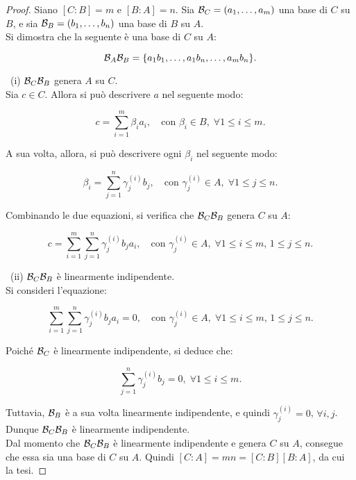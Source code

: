 \documentclass[11pt]{scrbook}
\begin{document}
\begin{proof}
    Siano $[C : B] = m$ e $[B : A] = n$. Sia
    $\mathcal{B}_C = (a_1, \ldots, a_m)$ una base
    di $C$ su $B$, e sia $\mathcal{B}_B = (b_1, \ldots, b_n)$ una
    base di $B$ su $A$. \\

    Si dimostra che la seguente è una base di $C$ su $A$:

    \[\mathcal{B}_A \mathcal{B}_B = \{ a_1b_1, \ldots, a_1b_n, \ldots, a_mb_n\}. \]

    \vskip 0.1in

    \ (i) $\mathcal{B}_C \mathcal{B}_B$ genera $A$ su $C$. \\

    Sia $c \in C$. Allora si può descrivere $a$ nel seguente
    modo:

    \[c = \sum_{i=1}^m \beta_i a_i, \quad \text{con } \beta_i \in B, \; \forall 1 \leq i \leq m.\]

    A sua volta, allora, si può descrivere ogni $\beta_i$ nel
    seguente modo:

    \[\beta_i = \sum_{j=1}^n \gamma_j^{(i)} b_j, \quad \text{con }
        \gamma_j^{(i)} \in A, \; \forall 1 \leq j \leq n.\]

    \vskip 0.1in

    Combinando le due equazioni, si verifica che $\mathcal{B}_C \mathcal{B}_B$ genera $C$ su $A$:

    \[ c = \sum_{i=1}^m \sum_{j=1}^n \gamma_j^{(i)} b_j a_i, \quad \text{con } \gamma_j^{(i)} \in A, \; \forall 1 \leq i \leq m, \, 1 \leq j \leq n. \]

    \vskip 0.1in

    \ (ii) $\mathcal{B}_C \mathcal{B}_B$ è linearmente indipendente. \\

    Si consideri l'equazione:

    \[ \sum_{i=1}^m \sum_{j=1}^n \gamma_j^{(i)} b_j a_i = 0, \quad \text{con } \gamma_j^{(i)} \in A, \; \forall 1 \leq i \leq m, \, 1 \leq j \leq n .\]

    Poiché $\mathcal{B}_C$ è linearmente indipendente, si deduce
    che:

    \[ \sum_{j=1}^n \gamma_j^{(i)} b_j = 0, \; \forall 1 \leq i \leq m. \]

    Tuttavia, $\mathcal{B}_B$ è a sua volta linearmente indipendente,
    e quindi $\gamma_j^{(i)} = 0$, $\forall i, j$. Dunque
    $\mathcal{B}_C \mathcal{B}_B$ è linearmente indipendente. \\

    Dal momento che $\mathcal{B}_C \mathcal{B}_B$ è linearmente indipendente e
    genera $C$ su $A$, consegue che essa sia una base di $C$ su
    $A$. Quindi $[C : A] = mn = [C : B][B : A]$, da cui la tesi.
\end{proof}
\end{document}
